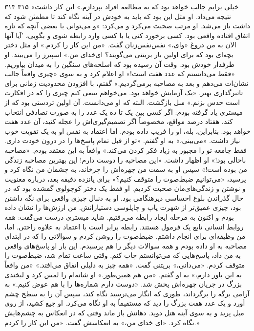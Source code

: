 ۳۱۴
۳۱۵
«خیلی برایم جالب خواهد بود که به مطالعه افراد بپردازم.» این کار داشت نتیجه می‌داد. او
مثل این بود که باید به خودش در آینه نگاه کند تا مطمئن شود که
داشت باز می‌شد. او مرتب صحبت می‌کرد و می‌کرد: «و می‌توانی با بعضی
آنچه که تازه اتفاق افتاده واقعی بود.
کسی برخورد کنی یا با کسی وارد رابطه شوی و بگویی، 'آیا آنها الان به من دروغ
«وای،» نفس‌نفس‌زنان گفت. «من این کار را کردم.» او مثل دختر بچه‌ای بود که برای اولین بار بریتنی
می‌گویند؟ ای‌خدای من.»
اسپیرز را می‌بیند. او طرفدار خودش بود.
وقت آن رسیده بود که اسلحه‌های سنگین را به میدان بیاوریم.
«فقط می‌دانستم که عدد هفت است!» او اعلام کرد و به سوی
«چیزی واقعاً جالب نشان‌ات می‌دهم و بعد به مصاحبه برمی‌گردیم,» گفتم، با افزودن محدودیت زمانی برای تاثیرگذاری بهتر. «یک آزمایش خواهد بود. می‌خواهم سعی کنم چیزی را که در افکارت است حدس بزنم.»
مبل بازگشت. البته که او می‌دانست. آن اولین تردستی بود که از میستری یاد گرفته بودم: اگر کسی بین یک تا ده یک عدد را به صورت تصادفی انتخاب کند، هفتاد درصد مواقع، مخصوصاً اگر تصمیم‌گیری‌اش را عجله کنید، آن عدد هفت خواهد بود.
بنابراین، بله، او را فریب داده بودم. اما اعتماد به نفس او به یک تقویت خوب نیاز داشت.
«می‌بینی،» به او گفتم. «تو از قبل تمام پاسخ‌ها را در درون خودت داری. فقط جامعه تو را مجبور به زیاد فکر کردن می‌کند.» واقعاً به این معتقد بودم.
«مصاحبه باحالی بود!» او اظهار داشت. «این مصاحبه را دوست دارم! این بهترین مصاحبه زندگی من بوده است!»
سپس او به سمت من چهره‌اش را چرخاند، به چشمان من نگاه کرد و پرسید، «می‌توانیم ضبط‌صوت را متوقف کنیم؟»
برای پانزده دقیقه بعد، درباره معنویت و نوشتن و زندگی‌های‌مان صحبت کردیم. او فقط یک دختر کوچولوی گمشده بود که در حال گذراندن بلوغ احساسی دیرهنگامی بود. او به دنبال چیزی واقعی برای نگه داشتن بود، چیزی عمیق‌تر از شهرت پاپ و چاپلوسی دستیارانش. من ارزش‌ها را نشان داده بودم و اکنون به مرحله ایجاد رابطه می‌رفتیم. شاید میستری درست می‌گفت: همه روابط انسانی تابع یک فرمول هستند.
رابطه برابر است با اعتماد به علاوه راحتی.
اما، من وظیفه‌ای برای انجام داشتم. ضبط‌صوت را روشن کردم و سوالاتی را که در ابتدای مصاحبه به او داده بودم و همه سوالات دیگر را هم پرسیدم. این بار او پاسخ‌های واقعی به من داد، پاسخ‌هایی که می‌توانستم چاپ کنم.
وقتی ساعت تمام شد، ضبط‌صوت را متوقف کردم.
«می‌دانی،» بریتنی گفت. «همه چیز به دلیلی اتفاق می‌افتد.»
«من واقعاً به این باور دارم،» به او گفتم.
«من هم همین‌طور.» او شانه‌ام را لمس کرد و لبخندی بزرگ در جریان چهره‌اش پخش شد. «دوست دارم شماره‌ها را با هم عوض کنیم.»
به آرامی برگه را برگرداند، طوری که انگار می‌ترسید نگاه کند، سپس آن را به سطح چشم آورد و یک عدد هفت بزرگ را دید که مستقیماً به او نگاه می‌کرد.
او جیغ کشید، از روی مبل پرید و به سوی آینه هتل دوید. دهانش باز ماند وقتی که در انعکاس به چشم‌هایش نگاه کرد.
«ای خدای من،» به انعکاسش گفت. «من این کار را کردم.»